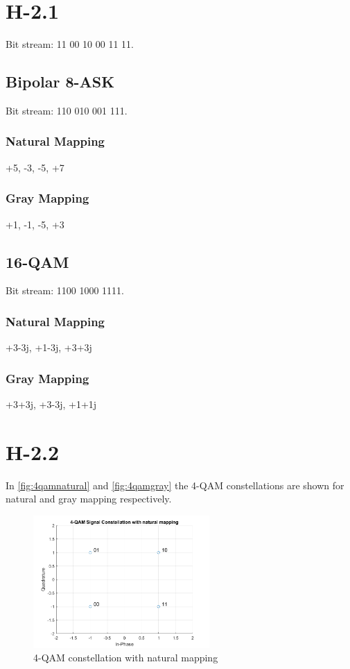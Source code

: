 \documentclass{article}
\begin{document}
\section{H-2.1}

Bit stream: 11 00 10 00 11 11.

\subsection{Bipolar 8-ASK}

Bit stream: 110 010 001 111.

\subsubsection{Natural Mapping}
+5, -3, -5, +7

\subsubsection{Gray Mapping}
+1, -1, -5, +3
\subsection{16-QAM}

Bit stream: 1100 1000 1111.

\subsubsection{Natural Mapping}
+3-3j, +1-3j, +3+3j

\subsubsection{Gray Mapping}
+3+3j, +3-3j, +1+1j

\section{H-2.2}
In \autoref{fig:4qamnatural} and \autoref{fig:4qamgray} the 4-QAM constellations are shown for natural and gray mapping respectively.

\begin{figure}[h]
\centering
\includegraphics[width=0.6\textwidth]{4_QAM_natural.png}
\caption{4-QAM constellation with natural mapping}
\label{fig:4qamnatural}
\end{figure}
\end{document}
